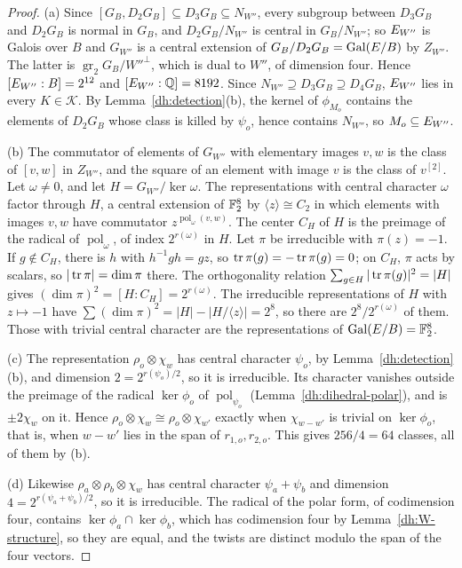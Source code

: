 \begin{proof}
(a) Since $[G_B,D_2G_B]\subseteq D_3G_B\subseteq N_{W''}$, every subgroup
between $D_3G_B$ and $D_2G_B$ is normal in $G_B$, and $D_2G_B/N_{W''}$ is
central in $G_B/N_{W''}$; so $E_{W''}$ is Galois over $B$ and $G_{W''}$ is a central
extension of $G_B/D_2G_B=\operatorname{Gal}(E/B)$ by $Z_{W''}$. The latter is
$\operatorname{gr}_2G_B/W''^\perp$, which is dual to $W''$, of dimension
four. Hence $[E_{W''}:B]=2^{12}$ and $[E_{W''}:\mathbb Q]=8192$. Since $N_{W''}\supseteq
D_3G_B\supseteq D_4G_B$, $E_{W''}$ lies in every $K\in\mathcal K$. By
Lemma~\ref{dh:detection}(b), the kernel of $\phi_{M_o}$ contains the elements
of $D_2G_B$ whose class is killed by $\psi_o$, hence contains $N_{W''}$, so
$M_o\subseteq E_{W''}$.

(b) The commutator of elements of $G_{W''}$ with elementary images $v,w$ is
the class of $[v,w]$ in $Z_{W''}$, and the square of an element with image $v$
is the class of $v^{[2]}$. Let $\omega\ne0$, and let $H=G_{W''}/\ker\omega$.
The representations with central character $\omega$ factor through $H$, a
central extension of $\mathbb F_2^8$ by $\langle z\rangle\cong C_2$ in which
elements with images $v,w$ have commutator $z^{\operatorname{pol}_\omega(v,w)}$.
The center $C_H$ of $H$ is the preimage of the radical of $\operatorname{pol}_\omega$,
of index $2^{r(\omega)}$ in $H$. Let $\pi$ be irreducible with $\pi(z)=-1$.
If $g\notin C_H$, there is $h$ with $h^{-1}gh=gz$, so
$\operatorname{tr}\pi(g)=-\operatorname{tr}\pi(g)=0$; on $C_H$, $\pi$ acts by scalars, so
$|\operatorname{tr}\pi|=\dim\pi$ there. The orthogonality relation
$\sum_{g\in H}|\operatorname{tr}\pi(g)|^2=|H|$ gives $(\dim\pi)^2=[H:C_H]=2^{r(\omega)}$.
The irreducible representations of $H$ with $z\mapsto-1$ have
$\sum(\dim\pi)^2=|H|-|H/\langle z\rangle|=2^8$, so there are
$2^8/2^{r(\omega)}$ of them. Those with trivial central character are the
representations of $\operatorname{Gal}(E/B)=\mathbb F_2^8$.

(c) The representation $\rho_o\otimes\chi_w$ has central character
$\psi_o$, by Lemma~\ref{dh:detection}(b), and dimension $2=2^{r(\psi_o)/2}$,
so it is irreducible. Its character vanishes outside the preimage of the
radical $\ker\phi_o$ of $\operatorname{pol}_{\psi_o}$
(Lemma~\ref{dh:dihedral-polar}), and is $\pm2\chi_w$ on it. Hence
$\rho_o\otimes\chi_w\cong\rho_o\otimes\chi_{w'}$ exactly when
$\chi_{w-w'}$ is trivial on $\ker\phi_o$, that is, when $w-w'$ lies in the
span of $r_{1,o},r_{2,o}$. This gives $256/4=64$ classes, all of them by (b).

(d) Likewise $\rho_a\otimes\rho_b\otimes\chi_w$ has central character
$\psi_a+\psi_b$ and dimension $4=2^{r(\psi_a+\psi_b)/2}$, so it is irreducible. The radical of
the polar form, of codimension four, contains $\ker\phi_a\cap\ker\phi_b$, which
has codimension four by Lemma~\ref{dh:W-structure}, so they are equal, and
the twists are distinct modulo the span of the four vectors.


\end{proof}
